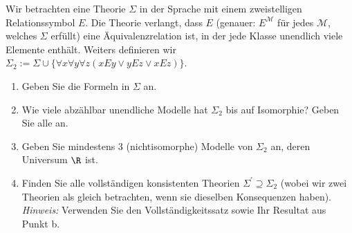 
\begin{exercise}[134]

Wir betrachten eine Theorie $\Sigma$ in der Sprache mit einem zweistelligen Relationssymbol $E$.
Die Theorie verlangt, dass $E$ (genauer: $E^{\mathscr{M}}$ für jedes $\mathscr{M}$,
welches $\Sigma$ erfüllt) eine Äquivalenzrelation ist, in der jede Klasse unendlich
viele Elemente enthält. Weiters definieren wir
$\Sigma_2 := \Sigma \cup \{\forall x \forall y \forall z (xEy \lor yEz \lor xEz)\}$.
\begin{enumerate}[label = \alph*.]
  \item Geben Sie die Formeln in $\Sigma$ an.
  \item Wie viele abzählbar unendliche Modelle hat $\Sigma_2$ bis auf Isomorphie?
  Geben Sie alle an.
  \item Geben Sie mindestens 3 (nichtisomorphe) Modelle von $\Sigma_2$ an, deren
  Universum $\R$ ist.
  \item Finden Sie alle vollständigen konsistenten Theorien $\Sigma^{\prime} \supseteq \Sigma_2$
  (wobei wir zwei Theorien als gleich betrachten, wenn sie dieselben Konsequenzen haben). \\
  \textit{Hinweis:} Verwenden Sie den Vollständigkeitssatz sowie Ihr Resultat aus Punkt b.
\end{enumerate}

\end{exercise}


\begin{solution}

\phantom{}

\end{solution}

